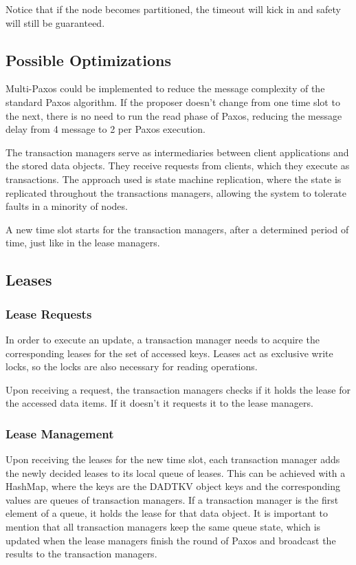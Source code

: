 \documentclass[times, 10pt,twocolumn]{article}
\begin{document}
Notice that if the node becomes partitioned, the timeout will kick in and safety will still be guaranteed.

\subsection{Possible Optimizations}
Multi-Paxos could be implemented to reduce the message complexity of the standard Paxos algorithm. If the proposer doesn't change from one time slot to the next, there is no need to run the read phase of Paxos, reducing the message delay from 4 message to 2 per Paxos execution.


The transaction managers serve as intermediaries between client applications and the stored data objects. They receive requests from clients, which they execute as transactions. The approach used is state machine replication, where the state is replicated throughout the transactions managers, allowing the system to tolerate faults in a minority of nodes.

A new time slot starts for the transaction managers, after a determined period of time, just like in the lease managers.

\subsection{Leases}
\subsubsection{Lease Requests}
In order to execute an update, a transaction manager needs to acquire the corresponding leases for the set of accessed keys. Leases act as exclusive write locks, so the locks are also necessary for reading operations.

Upon receiving a request, the transaction managers checks if it holds the lease for the accessed data items. If it doesn't it requests it to the lease managers. 

\subsubsection{Lease Management}
Upon receiving the leases for the new time slot, each transaction manager adds the newly decided leases to its local queue of leases. This can be achieved with a HashMap, where the keys are the DADTKV object keys and the corresponding values are queues of transaction managers. If a transaction manager is the first element of a queue, it holds the lease for that data object. It is important to mention that all transaction managers keep the same queue state, which is updated when the lease managers finish the round of Paxos and broadcast the results to the transaction managers.
\end{document}

